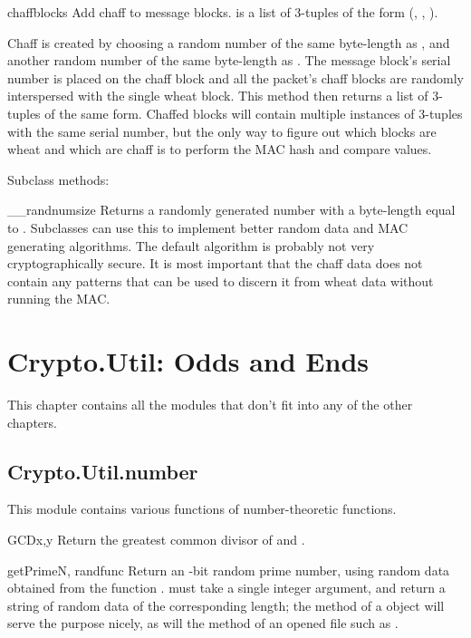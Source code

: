 \documentclass{howto}
\begin{document}
\begin{methoddesc}{chaff}{blocks}
Add chaff to message blocks.   is a list of 3-tuples of the
form (, , ).

Chaff is created by choosing a random number of the same
byte-length as , and another random number of the same
byte-length as .  The message block's serial number is placed
on the chaff block and all the packet's chaff blocks are randomly
interspersed with the single wheat block.  This method then
returns a list of 3-tuples of the same form.  Chaffed blocks will
contain multiple instances of 3-tuples with the same serial
number, but the only way to figure out which blocks are wheat and
which are chaff is to perform the MAC hash and compare values.
\end{methoddesc}

        Subclass methods:

\begin{methoddesc}{__randnum}{size}
Returns a randomly generated number with a byte-length equal
to .  Subclasses can use this to implement better random
data and MAC generating algorithms.  The default algorithm is
probably not very cryptographically secure.  It is most
important that the chaff data does not contain any patterns
that can be used to discern it from wheat data without running 
the MAC.
\end{methoddesc}

\section{Crypto.Util: Odds and Ends}
This chapter contains all the modules that don't fit into any of the
other chapters.  

\subsection{Crypto.Util.number}

This module contains various functions of number-theoretic functions.  

\begin{funcdesc}{GCD}{x,y}
Return the greatest common divisor of  and .
\end{funcdesc}

\begin{funcdesc}{getPrime}{N, randfunc}
Return an -bit random prime number, using random data obtained
from the function .   must take a single
integer argument, and return a string of random data of the
corresponding length; the  method of a
 object will serve the purpose nicely, as will the
 method of an opened file such as .
\end{funcdesc}
\end{document}
